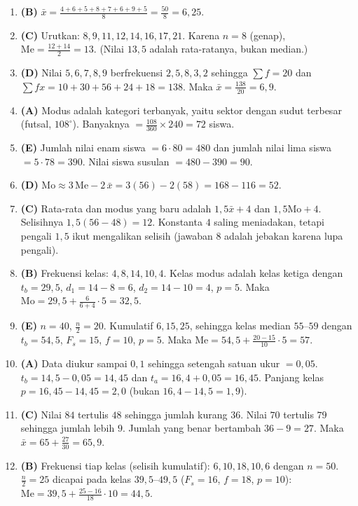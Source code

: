 \documentclass[a4paper,11pt]{article}
\newcommand{\dis}{\displaystyle}
\newcommand{\Me}{\mathrm{Me}}
\newcommand{\Mo}{\mathrm{Mo}}
\begin{document}
\small\begin{enumerate}[leftmargin=2em,itemsep=2pt,topsep=2pt]
\item[\textbf{1.}] \textbf{(B)} $\bar{x}=\dis\frac{4+6+5+8+7+6+9+5}{8}=\dis\frac{50}{8}=6{,}25$.
\item[\textbf{2.}] \textbf{(C)} Urutkan: $8,9,11,12,14,16,17,21$. Karena $n=8$ (genap), $\Me=\dis\frac{12+14}{2}=13$. (Nilai $13{,}5$ adalah rata-ratanya, bukan median.)
\item[\textbf{3.}] \textbf{(D)} Nilai $5,6,7,8,9$ berfrekuensi $2,5,8,3,2$ sehingga $\sum f=20$ dan $\sum fx=10+30+56+24+18=138$. Maka $\bar{x}=\dis\frac{138}{20}=6{,}9$.
\item[\textbf{4.}] \textbf{(A)} Modus adalah kategori terbanyak, yaitu sektor dengan sudut terbesar (futsal, $108^\circ$). Banyaknya $=\dis\frac{108}{360}\times240=72$ siswa.
\item[\textbf{5.}] \textbf{(E)} Jumlah nilai enam siswa $=6\cdot80=480$ dan jumlah nilai lima siswa $=5\cdot78=390$. Nilai siswa susulan $=480-390=90$.
\item[\textbf{6.}] \textbf{(D)} $\Mo\approx3\,\Me-2\,\bar{x}=3(56)-2(58)=168-116=52$.
\item[\textbf{7.}] \textbf{(C)} Rata-rata dan modus yang baru adalah $1{,}5\bar{x}+4$ dan $1{,}5\Mo+4$. Selisihnya $1{,}5(56-48)=12$. Konstanta $4$ saling meniadakan, tetapi pengali $1{,}5$ ikut mengalikan selisih (jawaban $8$ adalah jebakan karena lupa pengali).
\item[\textbf{8.}] \textbf{(B)} Frekuensi kelas: $4,8,14,10,4$. Kelas modus adalah kelas ketiga dengan $t_b=29{,}5$, $d_1=14-8=6$, $d_2=14-10=4$, $p=5$. Maka $\Mo=29{,}5+\dis\frac{6}{6+4}\cdot5=32{,}5$.
\item[\textbf{9.}] \textbf{(E)} $n=40$, $\dis\frac n2=20$. Kumulatif $6,15,25$, sehingga kelas median $55$--$59$ dengan $t_b=54{,}5$, $F_s=15$, $f=10$, $p=5$. Maka $\Me=54{,}5+\dis\frac{20-15}{10}\cdot5=57$.
\item[\textbf{10.}] \textbf{(A)} Data diukur sampai $0{,}1$ sehingga setengah satuan ukur $=0{,}05$. $t_b=14{,}5-0{,}05=14{,}45$ dan $t_a=16{,}4+0{,}05=16{,}45$. Panjang kelas $p=16{,}45-14{,}45=2{,}0$ (bukan $16{,}4-14{,}5=1{,}9$).
\item[\textbf{11.}] \textbf{(C)} Nilai $84$ tertulis $48$ sehingga jumlah kurang $36$. Nilai $70$ tertulis $79$ sehingga jumlah lebih $9$. Jumlah yang benar bertambah $36-9=27$. Maka $\bar{x}=65+\dis\frac{27}{30}=65{,}9$.
\item[\textbf{12.}] \textbf{(B)} Frekuensi tiap kelas (selisih kumulatif): $6,10,18,10,6$ dengan $n=50$. $\dis\frac n2=25$ dicapai pada kelas $39{,}5$--$49{,}5$ ($F_s=16$, $f=18$, $p=10$): $\Me=39{,}5+\dis\frac{25-16}{18}\cdot10=44{,}5$.

\end{enumerate}
\end{document}
